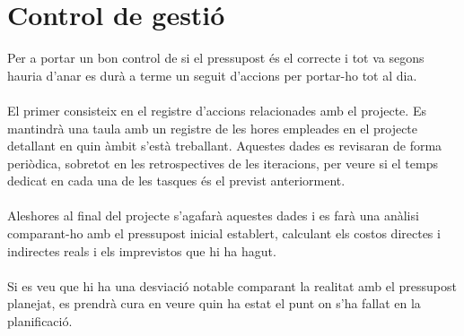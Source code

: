 
\section{Control de gestió}

Per a portar un bon control de si el pressupost és el correcte i tot va segons hauria d’anar es durà a terme un seguit d’accions per portar-ho tot al dia.
\\\\
El primer consisteix en el registre d’accions relacionades amb el projecte. Es mantindrà una taula amb un registre de les hores empleades en el projecte detallant en quin àmbit s’està treballant. Aquestes dades es revisaran de forma periòdica, sobretot en les retrospectives de les iteracions, per veure si el temps dedicat en cada una de les tasques és el previst anteriorment.
\\\\
Aleshores al final del projecte s’agafarà aquestes dades i es farà una anàlisi comparant-ho amb el pressupost inicial establert, calculant els costos directes i indirectes reals i els imprevistos que hi ha hagut.
\\\\
Si es veu que hi ha una desviació notable comparant la realitat amb el pressupost planejat, es prendrà cura en veure quin ha estat el punt on s’ha fallat en la planificació.